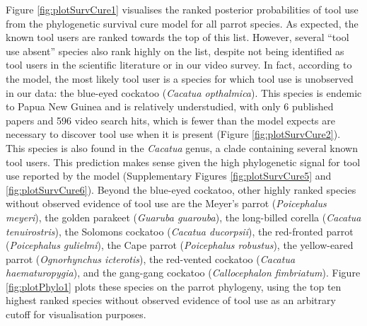 \documentclass[
  man, donotrepeattitle,floatsintext]{apa6}
\begin{document}
Figure \ref{fig:plotSurvCure1} visualises the ranked posterior probabilities of
tool use from the phylogenetic survival cure model for all parrot species. As
expected, the known tool users are ranked towards the top of this list. However,
several ``tool use absent'' species also rank highly on the list, despite not
being identified as tool users in the scientific literature or in our video
survey. In fact, according to the model, the most likely tool user is a species
for which tool use is unobserved in our data: the blue-eyed cockatoo (\emph{Cacatua
opthalmica}). This species is endemic to Papua New Guinea and is relatively
understudied, with only 6 published papers
and 596 video search hits, which is fewer than the
model expects are necessary to discover tool use when it is present (Figure
\ref{fig:plotSurvCure2}). This species is also found in the \emph{Cacatua} genus, a
clade containing several known tool users. This prediction makes sense given the
high phylogenetic signal for tool use reported by the model (Supplementary
Figures \ref{fig:plotSurvCure5} and \ref{fig:plotSurvCure6}). Beyond the
blue-eyed cockatoo, other highly ranked species without observed evidence of
tool use are the Meyer's parrot (\emph{Poicephalus meyeri}), the golden parakeet
(\emph{Guaruba guarouba}), the long-billed corella (\emph{Cacatua tenuirostris}), the
Solomons cockatoo (\emph{Cacatua ducorpsii}), the red-fronted parrot (\emph{Poicephalus
gulielmi}), the Cape parrot (\emph{Poicephalus robustus}), the yellow-eared parrot
(\emph{Ognorhynchus icterotis}), the red-vented cockatoo (\emph{Cacatua haematuropygia}),
and the gang-gang cockatoo (\emph{Callocephalon fimbriatum}). Figure
\ref{fig:plotPhylo1} plots these species on the parrot phylogeny, using the top
ten highest ranked species without observed evidence of tool use as an arbitrary
cutoff for visualisation purposes.
\end{document}
